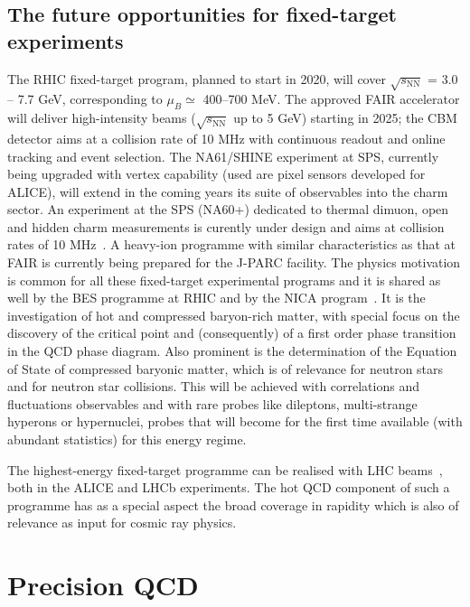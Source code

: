 \subsection{The future opportunities for fixed-target experiments} %

The RHIC fixed-target program, planned to start in 2020, will cover $\sqrt{s_{\mathrm{NN}}}$ = 3.0 -- 7.7 GeV, corresponding to $\mu_B\simeq$ 400--700 MeV. 
The approved FAIR accelerator will deliver high-intensity beams ($\sqrt{s_{\mathrm{NN}}}$ up to 5 GeV) starting in 2025; the CBM detector aims at a collision rate of 10 MHz with continuous readout and online tracking and event selection. 
The  NA61/SHINE experiment at SPS, currently being upgraded with vertex capability (used are pixel sensors developed for ALICE), will extend in the coming years its suite of observables into the charm sector.
An experiment at the SPS (NA60+) dedicated to thermal dimuon, open and hidden charm measurements is curently under design and aims at collision rates of 10 MHz~\cite{Dainese:2019xrz}.
A heavy-ion programme with similar characteristics as that at FAIR is currently being prepared for the J-PARC facility.
The physics motivation \cite{Friman:2011zz} is common for all these fixed-target experimental programs and it is shared as well by the BES programme at RHIC and by the NICA program~\cite{Ablyazimov:2017guv,Bzdak:2019pkr}.
It is the investigation of hot and compressed baryon-rich matter, with special focus on the discovery of the critical point and (consequently) of a first order phase transition in the QCD phase diagram. Also prominent is the determination of the Equation of State of compressed baryonic matter, which is of relevance for neutron stars and for neutron star collisions.
This will be achieved with correlations and fluctuations observables and with rare probes like dileptons, multi-strange hyperons or hypernuclei, probes that will become for the first time available (with abundant statistics) for this energy regime.

The highest-energy fixed-target programme can be realised with LHC beams~\cite{Hadjidakis:2018ifr}, both in the ALICE and LHCb experiments. The hot QCD component of such a programme has as a special aspect the broad coverage in rapidity which is also of relevance as input for cosmic ray physics.
\section{Precision QCD}
\label{precision_sec}

